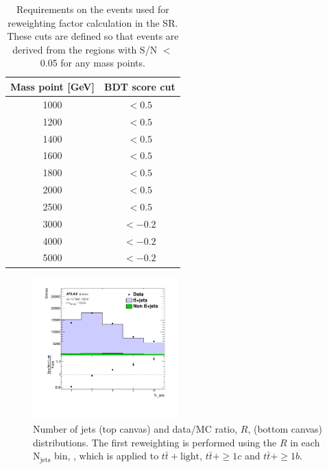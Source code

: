 \begin{table}[H]
  \centering
  \begin{tabular*}{70mm}{@{\extracolsep{\fill}}cc}
    \hline\hline
    Mass point [GeV] & BDT score cut\\
    \hline
    1000             & $< 0.5$\\
    1200             & $< 0.5$\\
    1400             & $< 0.5$\\
    1600             & $< 0.5$\\
    1800             & $< 0.5$\\
    2000             & $< 0.5$\\
    2500             & $< 0.5$\\
    3000             & $<-0.2$\\
    4000             & $<-0.2$\\
    5000             & $<-0.2$\\
    \hline\hline
  \end{tabular*}
  \caption{Requirements on the events used for reweighting factor calculation in the SR. These cuts are defined so that events are derived from the regions with S/N $<$ 0.05 for any mass points.}
  \label{tab:ReqForRWControlRegion}
\end{table}

\begin{figure}[H]
    \centering
    \includegraphics[width=0.50\textwidth]{images/BkgModeling/RWFactors_Njets.png}
    \caption{Number of jets (top canvas) and data/MC ratio, $R$, (bottom canvas) distributions. The first reweighting is performed using the $R$ in each $\text{N}_{\text{jets}}$ bin, , which is applied to $t\bar{t}+\text{light}$, $t\bar{t}+\geq1c$ and $t\bar{t}+\geq1b$.}
    \label{fig:RWFactors_Njets_CR}
\end{figure}

